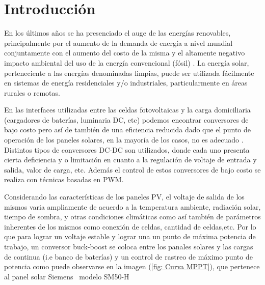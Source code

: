 


\maketitle\thispagestyle{fancy}



\section{Introducción}

    En los últimos años se ha presenciado el auge de las energías renovables, principalmente por el aumento de la demanda de energía a nivel mundial conjuntamente con el aumento del costo de la misma y el altamente negativo impacto ambiental del uso de la energía convencional (fósil) \cite{gallardo2014diseno}. La energía solar, perteneciente a las energías denominadas limpias, puede ser utilizada fácilmente en sistemas de energía  residenciales y/o industriales, particularmente en áreas rurales o remotas. 
    
    En las interfaces utilizadas entre las celdas fotovoltaicas y la carga domiciliaria (cargadores de baterías, luminaria DC, etc) podemos encontrar conversores de bajo costo pero así de también de una eficiencia reducida dado que el punto de operación de los paneles solares, en la mayoría de los casos, no es adecuado \cite{Chang}. Distintos tipos de conversores DC-DC son utilizados, donde cada uno presenta cierta deficiencia y o limitación en cuanto a la regulación de voltaje de entrada y salida, valor de carga, etc. Además el control de estos conversores de bajo costo se realiza con técnicas basadas en PWM. 
    
    Considerando las características de los paneles PV, el voltaje de salida de los mismos varia ampliamente de acuerdo a la temperatura ambiente, radiación solar, tiempo de sombra, y otras condiciones climáticas como así también de parámetros inherentes de los mismos como conexión de celdas, cantidad de celdas,etc. Por lo que para lograr un voltaje estable y lograr una un punto de máxima potencia de trabajo, un conversor buck-boost se coloca entre los panales solares y las cargas de continua (i.e banco de baterías) y un control de rastreo de máximo punto de potencia  \cite{Chang} como puede observarse en la imagen (\ref{fig: Curva MPPT}), que pertenece al panel solar Siemens \textregistered \ modelo SM50-H
    
